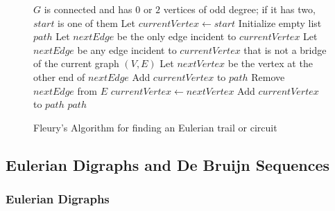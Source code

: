 \documentclass{article}
\theoremstyle{definition}
\begin{document}
\begin{figure}[p]
\vspace{0.5em}
\begin{minipage}{\linewidth}
\begin{algorithm}[H]
\caption{Fleury's Algorithm for finding an Eulerian trail or circuit}
\begin{algorithmic}[1]
\Require $G$ is connected and has $0$ or $2$ vertices of odd degree; if it has two, $start$ is one of them
    \State Let $currentVertex \gets start$
    \State Initialize empty list $path$
            \State Let $nextEdge$ be the only edge incident to $currentVertex$
        \Else
            \State Let $nextEdge$ be any edge incident to $currentVertex$ that is not a bridge of the current graph $(V, E)$
        \EndIf
        \State Let $nextVertex$ be the vertex at the other end of $nextEdge$
        \State Add $currentVertex$ to $path$
        \State Remove $nextEdge$ from $E$
        \State $currentVertex \gets nextVertex$
    \EndWhile
    \State Add $currentVertex$ to $path$ 
    \State \Return $path$
\EndProcedure
\end{algorithmic}
\end{algorithm}
\end{minipage}
\end{figure}

\clearpage

\subsection{Eulerian Digraphs and De Bruijn Sequences}
\subsubsection{Eulerian Digraphs}
\end{document}
